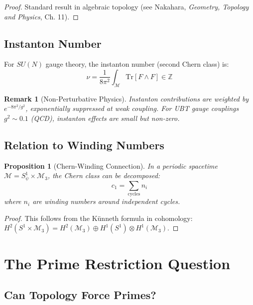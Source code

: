\documentclass[12pt]{article}
\newtheorem{proposition}[definition]{Proposition}
\newtheorem{remark}[definition]{Remark}
\newcommand{\Z}{\mathbb{Z}}
\newcommand{\M}{\mathcal{M}}
\newcommand{\Tr}{\mathrm{Tr}}
\begin{document}
\begin{proof}
Standard result in algebraic topology (see Nakahara, \textit{Geometry, Topology and Physics}, Ch. 11).
\end{proof}

\subsection{Instanton Number}

For $SU(N)$ gauge theory, the instanton number (second Chern class) is:
\begin{equation}
\nu = \frac{1}{8\pi^2} \int_{\M} \Tr[F \wedge F] \in \Z
\end{equation}

\begin{remark}[Non-Perturbative Physics]
Instanton contributions are weighted by $e^{-8\pi^2/g^2}$, exponentially suppressed at weak coupling. For UBT gauge couplings $g^2 \sim 0.1$ (QCD), instanton effects are small but non-zero.
\end{remark}

\subsection{Relation to Winding Numbers}

\begin{proposition}[Chern-Winding Connection]
In a periodic spacetime $\M = S^1_\psi \times \M_3$, the Chern class can be decomposed:
\begin{equation}
c_1 = \sum_{\text{cycles}} n_i
\end{equation}
where $n_i$ are winding numbers around independent cycles.
\end{proposition}

\begin{proof}
This follows from the Künneth formula in cohomology: $H^2(S^1 \times \M_3) = H^2(\M_3) \oplus H^1(S^1) \otimes H^1(\M_3)$.
\end{proof}

\section{The Prime Restriction Question}
\label{sec:primes}

\subsection{Can Topology Force Primes?}
\end{document}
